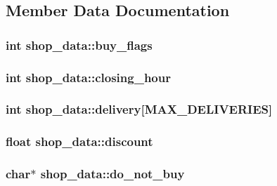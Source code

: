 \subsection{Member Data Documentation}
\hypertarget{structshop__data_ac26e86529152a6835e4e72ac8715589b}{
\subsubsection[{buy\-\_\-flags}]{\setlength{\rightskip}{0pt plus 5cm}int shop\-\_\-data\-::buy\-\_\-flags}}\label{structshop__data_ac26e86529152a6835e4e72ac8715589b}
\hypertarget{structshop__data_a1b3f1f304596c9bfdacc03dfe9d840dd}{
\subsubsection[{closing\-\_\-hour}]{\setlength{\rightskip}{0pt plus 5cm}int shop\-\_\-data\-::closing\-\_\-hour}}\label{structshop__data_a1b3f1f304596c9bfdacc03dfe9d840dd}
\hypertarget{structshop__data_aa1d3a8cef458455a884c2815c32403f6}{
\subsubsection[{delivery}]{\setlength{\rightskip}{0pt plus 5cm}int shop\-\_\-data\-::delivery\mbox{[}{\bf M\-A\-X\-\_\-\-D\-E\-L\-I\-V\-E\-R\-I\-E\-S}\mbox{]}}}\label{structshop__data_aa1d3a8cef458455a884c2815c32403f6}
\hypertarget{structshop__data_aaa8ef610845d6a330c6993fb88fa1e3d}{
\subsubsection[{discount}]{\setlength{\rightskip}{0pt plus 5cm}float shop\-\_\-data\-::discount}}\label{structshop__data_aaa8ef610845d6a330c6993fb88fa1e3d}
\hypertarget{structshop__data_a6cc84ced95b2f064fbf2595e7a5966ae}{
\subsubsection[{do\-\_\-not\-\_\-buy}]{\setlength{\rightskip}{0pt plus 5cm}char$\ast$ shop\-\_\-data\-::do\-\_\-not\-\_\-buy}}\label{structshop__data_a6cc84ced95b2f064fbf2595e7a5966ae}
